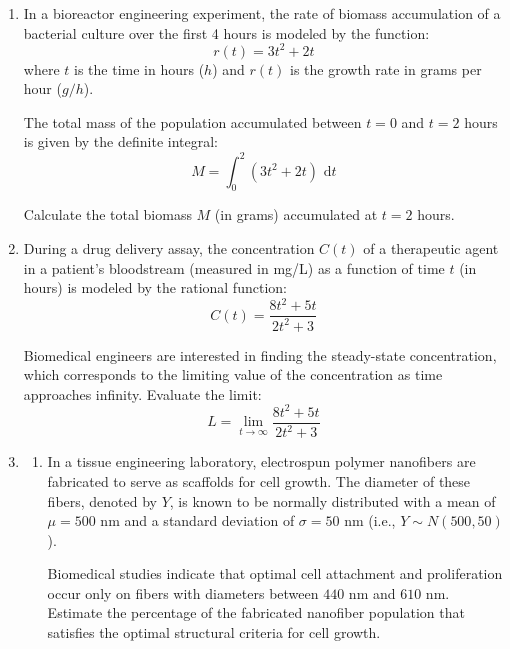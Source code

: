 \documentclass[11pt,svgnames,spanish,oneside]{amsart}
\newcommand{\dd}{\, \text{d}}
\begin{document}
\begin{enumerate}[label=\textbf{P\arabic*.},itemsep=1em]
  \item In a bioreactor engineering experiment, the rate of biomass accumulation of a bacterial culture over the first 4 hours is modeled by the function:
  $$ r(t) = 3t^2 + 2t $$
  where $t$ is the time in hours ($h$) and $r(t)$ is the growth rate in grams per hour ($g/h$).

  The total mass of the population accumulated between $t = 0$ and $t = 2$ hours is given by the definite integral:
  $$ M = \int_{0}^{2} (3t^2 + 2t) \,\dd t $$

  Calculate the total biomass $M$ (in grams) accumulated at $t = 2$ hours.

  \medskip
  \item During a drug delivery assay, the concentration $C(t)$ of a therapeutic agent in a patient's bloodstream (measured in mg/L) as a function of time $t$ (in hours) is modeled by the rational function:
  $$ C(t) = \frac{8t^2 + 5t}{2t^2 + 3} $$

  Biomedical engineers are interested in finding the steady-state concentration, which corresponds to the limiting value of the concentration as time approaches infinity.
    Evaluate the limit:
    $$ L = \lim_{t \to \infty} \frac{8t^2 + 5t}{2t^2 + 3} $$


  \medskip
  \item
  \begin{enumerate}
    \item In a tissue engineering laboratory, electrospun polymer nanofibers are fabricated to serve as scaffolds for cell growth. The diameter of these fibers, denoted by $Y$, is known to be normally distributed with a mean of $\mu = 500$ nm and a standard deviation of $\sigma = 50$ nm (i.e., $Y \sim N(500, 50)$).

    Biomedical studies indicate that optimal cell attachment and proliferation occur only on fibers with diameters between $440$ nm and $610$ nm. Estimate the percentage of the fabricated nanofiber population that satisfies the optimal structural criteria for cell growth.


\end{enumerate}
\end{enumerate}
\end{document}
